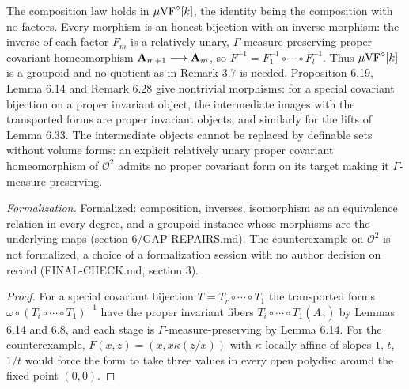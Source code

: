 \setcounter{theorem}{34}
\begin{remark}
\label{dia-cat-well}
\leanok
{}
The composition law holds in $\mu\mathrm{VF}^{\diamond}[k]$, the identity being the composition with no factors. Every morphism is an honest bijection with an inverse morphism: the inverse of each factor $F_m$ is a relatively unary, $\Gamma$-measure-preserving proper covariant homeomorphism $\mathbf{A}_{m+1}\longrightarrow\mathbf{A}_m$, so $F^{-1}=F_1^{-1}\circ\cdots\circ F_l^{-1}$. Thus $\mu\mathrm{VF}^{\diamond}[k]$ is a groupoid and no quotient as in Remark 3.7 is needed. Proposition 6.19, Lemma 6.14 and Remark 6.28 give nontrivial morphisms: for a special covariant bijection on a proper invariant object, the intermediate images with the transported forms are proper invariant objects, and similarly for the lifts of Lemma 6.33. The intermediate objects cannot be replaced by definable sets without volume forms: an explicit relatively unary proper covariant homeomorphism of $\mathcal{O}^2$ admits no proper covariant form on its target making it $\Gamma$-measure-preserving.

\emph{Formalization.} Formalized: composition, inverses, isomorphism as an equivalence relation in every degree, and a groupoid instance whose morphisms are the underlying maps (section 6/GAP-REPAIRS.md). The counterexample on $\mathcal{O}^2$ is not formalized, a choice of a formalization session with no author decision on record (FINAL-CHECK.md, section 3).
\end{remark}

\begin{proof}
For a special covariant bijection $T=T_r\circ\cdots\circ T_1$ the transported forms $\omega\circ(T_i\circ\cdots\circ T_1)^{-1}$ have the proper invariant fibers $T_i\circ\cdots\circ T_1(A_\gamma)$ by Lemmas 6.14 and 6.8, and each stage is $\Gamma$-measure-preserving by Lemma 6.14. For the counterexample, $F(x,z)=(x,x\kappa(z/x))$ with $\kappa$ locally affine of slopes $1$, $t$, $1/t$ would force the form to take three values in every open polydisc around the fixed point $(0,0)$.
\end{proof}

